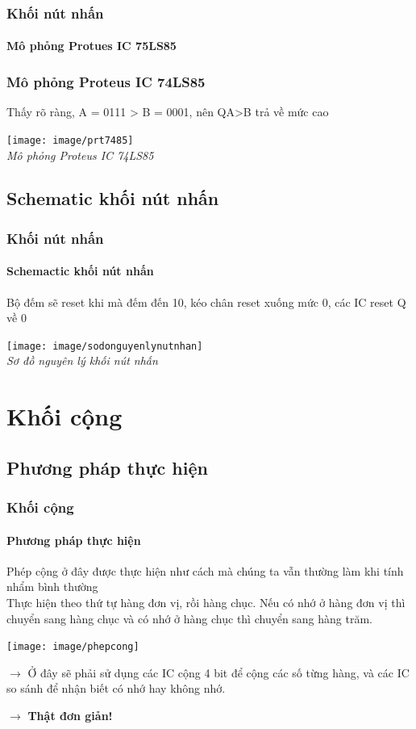 \documentclass[12pt,a4paper]{beamer}
\begin{document}
\begin{frame}
	\frametitle{Khối nút nhấn}
	\framesubtitle{Mô phỏng Protues IC 75LS85}
	\frametitle{Mô phỏng Proteus IC 74LS85}
	Thấy rõ ràng, A = 0111 > B = 0001, nên QA>B trả về mức cao
	\begin{center}
		\texttt{[image: image/prt7485]}\\
		\textit{Mô phỏng Proteus IC 74LS85}
	\end{center}
	
\end{frame}


\subsection{Schematic khối nút nhấn}
\begin{frame}
	\frametitle{Khối nút nhấn}
	\framesubtitle{Schemactic khối nút nhấn}
	
	Bộ đếm sẽ reset khi mà đếm đến 10, kéo chân reset xuống mức 0, các IC reset Q về 0
	\begin{center}
		\texttt{[image: image/sodonguyenlynutnhan]}\\
		\textit{Sơ đồ nguyên lý khối nút nhấn}
	\end{center}
\end{frame}

\section{Khối cộng}
\subsection{Phương pháp thực hiện}


\begin{frame}
	
	\frametitle{Khối cộng}
	\framesubtitle{Phương pháp thực hiện}
	
	\begin{multicols}{2}
		Phép cộng ở đây được thực hiện như cách mà chúng ta vẫn thường làm khi tính nhẩm bình thường\\
		Thực hiện theo thứ tự hàng đơn vị, rồi hàng chục. Nếu có nhớ ở hàng đơn vị thì chuyển sang hàng chục và có nhớ ở hàng chục thì chuyển sang hàng trăm.
		\hfill\null\columnbreak
		\begin{center}
			\texttt{[image: image/phepcong]}
		\end{center}
			$\to$ Ở đây sẽ phải sử dụng các IC cộng 4 bit để cộng các số từng hàng, và các IC so sánh để nhận biết có nhớ hay không nhớ.
	\end{multicols}
	$\to$ \textbf{Thật đơn giản!}
\end{frame}
\end{document}
